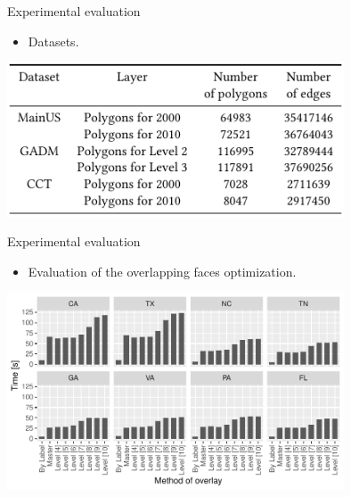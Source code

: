 \documentclass{beamer}
\begin{document}
    \begin{frame}{Experimental evaluation}
        \begin{itemize}
            \item Datasets.
        \end{itemize}
        \vspace{1cm}
        \centering
        \includegraphics[width=0.75\textwidth]{figures/datasets}
    \end{frame}    
    
    \begin{frame}{Experimental evaluation}
        \begin{itemize}
            \item Evaluation of the overlapping faces optimization.
        \end{itemize}
        \vspace{1cm}
        \centering
        \includegraphics[width=0.75\textwidth]{figures/overlay_tester}
    \end{frame}    
\end{document}
